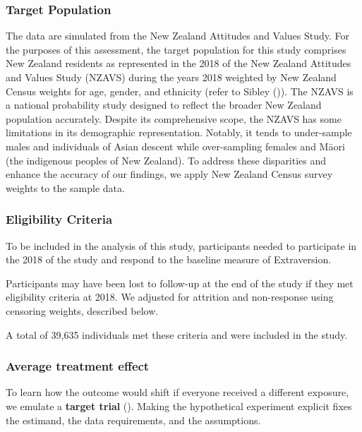 \documentclass[
  single column]{article}
\begin{document}
\subsubsection{Target Population}\label{target-population}

The data are simulated from the New Zealand Attitudes and Values Study.
For the purposes of this assessment, the target population for this
study comprises New Zealand residents as represented in the 2018 of the
New Zealand Attitudes and Values Study (NZAVS) during the years 2018
weighted by New Zealand Census weights for age, gender, and ethnicity
(refer to Sibley ()). The NZAVS is a
national probability study designed to reflect the broader New Zealand
population accurately. Despite its comprehensive scope, the NZAVS has
some limitations in its demographic representation. Notably, it tends to
under-sample males and individuals of Asian descent while over-sampling
females and Māori (the indigenous peoples of New Zealand). To address
these disparities and enhance the accuracy of our findings, we apply New
Zealand Census survey weights to the sample data.

\subsubsection{Eligibility Criteria}\label{eligibility-criteria}

To be included in the analysis of this study, participants needed to
participate in the 2018 of the study and respond to the baseline measure
of Extraversion.

Participants may have been lost to follow-up at the end of the study if
they met eligibility criteria at 2018. We adjusted for attrition and
non-response using censoring weights, described below.

A total of 39,635 individuals met these criteria and were included in
the study.

\subsubsection{Average treatment effect}\label{average-treatment-effect}

To learn how the outcome would shift if everyone received a different
exposure, we emulate a \textbf{target trial}
(). Making the
hypothetical experiment explicit fixes the estimand, the data
requirements, and the assumptions.
\end{document}
